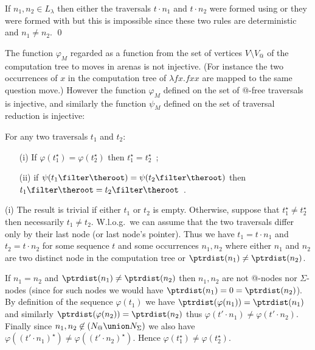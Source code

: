 \begin{compactitem}
\item If  $n_1,n_2\in L_\lambda$ then either the traversals $t \cdot n_1$
    and $t \cdot n_2$ were formed using
     or they were formed with
     but this is impossible since these two rules are
    deterministic and $n_1 \neq n_2$. \qed
\end{compactitem}




The function $\varphi_M$ regarded as a function from the set of
vertices $V \setminus V_@$ of the computation tree to moves in
arenas is not injective. (For instance the two occurrences of $x$ in
the computation tree of $\lambda f x. f x x$ are mapped to the same
question move.) However the function $\varphi_M$ defined on the set
of @-free traversals is injective, and similarly the function
$\psi_M$ defined on the set of traversal reduction is injective:

\begin{lemma}
\label{lem:varphiinjective}
For any two traversals $t_1$ and $t_2$:
\begin{itemize}
\item[(i)] If $\varphi (t_1^\star) = \varphi (t_2^\star)$ then $t_1^\star =t_2^\star$\ ;
\item[(ii)] if $\psi (t_1 \filter \theroot ) = \psi (t_2 \filter \theroot )$ then $t_1\filter \theroot = t_2\filter \theroot$\ .
\end{itemize}
\end{lemma}
\proof \noindent (i) The result is trivial if either $t_1$ or $t_2$
is empty. Otherwise, suppose that $t_1^\star\neq t_2^\star$ then
necessarily $t_1 \neq t_2$. W.l.o.g.\ we can assume that the two
traversals differ only by their last node (or last node's pointer).
Thus we have $t_1 = t \cdot n_1$ and $t_2 = t \cdot n_2$ for some
sequence $t$ and some occurrences $n_1, n_2$ where either $n_1$ and
$n_2$ are two distinct node in the computation tree or
$\ptrdist(n_1) \neq \ptrdist(n_2)$.

If $n_1 = n_2$ and $\ptrdist(n_1) \neq \ptrdist(n_2)$ then $n_1,n_2$
are not @-nodes nor $\Sigma$-nodes (since for such nodes we would
have $\ptrdist(n_1) = 0 = \ptrdist(n_2)$). By definition of the
sequence $\varphi(t_1)$ we have $\ptrdist(\varphi(n_1)) =
\ptrdist(n_1)$ and similarly $\ptrdist(\varphi(n_2)) =
\ptrdist(n_2)$ thus $\varphi(t' \cdot n_1) \neq \varphi(t' \cdot
n_2)$. Finally since $n_1,n_2 \not\in (N_@ \union N_\Sigma)$ we also
have $\varphi((t' \cdot n_1)^\star) \neq \varphi((t' \cdot
n_2)^\star)$. Hence $\varphi(t_1^\star) \neq \varphi(t_2^\star)$.

